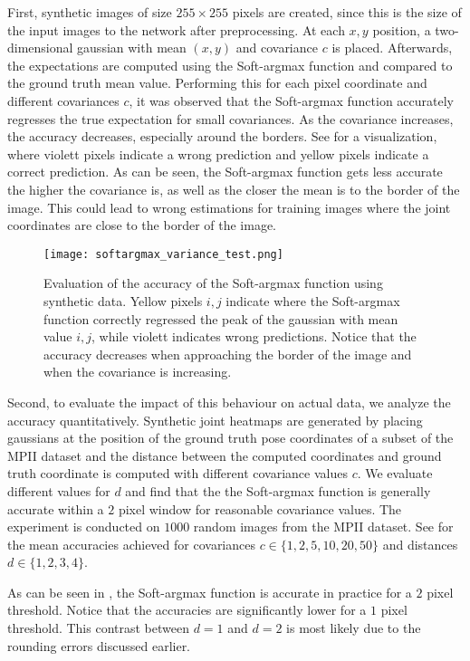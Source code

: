 First, synthetic images of size $255 \times 255$ pixels are created, since this is the size of the input images to the network after preprocessing.
At each $x,y$ position, a two-dimensional gaussian with mean $(x,y)$ and covariance $c$ is placed.
Afterwards, the expectations are computed using the Soft-argmax function and compared to the ground truth mean value.
Performing this for each pixel coordinate and different covariances $c$, it was observed that the Soft-argmax function accurately regresses the true expectation for small covariances.
As the covariance increases, the accuracy decreases, especially around the borders.
See  for a visualization, where violett pixels indicate a wrong prediction and yellow pixels indicate a correct prediction.
As can be seen, the Soft-argmax function gets less accurate the higher the covariance is, as well as the closer the mean is to the border of the image.
This could lead to wrong estimations for training images where the joint coordinates are close to the border of the image.

\begin{figure}[htb!]
    \centering
    \texttt{[image: softargmax\_variance\_test.png]}
    \caption{Evaluation of the accuracy of the Soft-argmax function using synthetic data. Yellow pixels $i,j$ indicate where the Soft-argmax function correctly regressed the peak of the gaussian with mean value $i,j$, while violett indicates wrong predictions. Notice that the accuracy decreases when approaching the border of the image and when the covariance is increasing. }
    \label{fig:softargmax_variance_test}
\end{figure}

Second, to evaluate the impact of this behaviour on actual data, we analyze the accuracy quantitatively.
Synthetic joint heatmaps are generated by placing gaussians at the position of the ground truth pose coordinates of a subset of the MPII dataset and the distance between the computed coordinates and ground truth coordinate is computed with different covariance values $c$.
We evaluate different values for $d$ and find that the the Soft-argmax function is generally accurate within a $2$ pixel window for reasonable covariance values.
The experiment is conducted on $1000$ random images from the MPII dataset.
See  for the mean accuracies achieved for covariances $c \in \{1, 2, 5, 10, 20, 50 \}$ and distances $d \in \{1, 2, 3, 4\}$.

As can be seen in , the Soft-argmax function is accurate in practice for a $2$ pixel threshold.
Notice that the accuracies are significantly lower for a $1$ pixel threshold.
This contrast between $d=1$ and $d=2$ is most likely due to the rounding errors discussed earlier.

